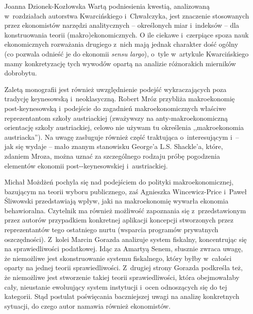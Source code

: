 \begin{recplenv}{Joanna Dzionek-Kozłowska}
Wartą podniesienia kwestią, analizowaną w~rozdziałach autorstwa Kwarcińskiego i~Chwałczyka, jest znaczenie stosowanych
przez ekonomistów narzędzi analitycznych -- określonych miar i~indeksów -- dla konstruowania teorii (makro)ekonomicznych.
O ile ciekawe i~czerpiące spoza nauk ekonomicznych rozważania drugiego z~nich mają jednak charakter dość ogólny (co
pozwala odnieść je do ekonomii \textit{sensu largo}), o~tyle w~artykule Kwarcińskiego mamy konkretyzację tych wywodów
opartą na analizie różnorakich mierników dobrobytu. 

Zaletą monografii jest również uwzględnienie podejść wykraczających poza tradycję keynesowską i~neoklasyczną. Robert
Mróz przybliża makroekonomię post-keynesowską i~podejście do zagadnień makroekonomicznych właściwe reprezentantom
szkoły austriackiej (zważywszy na anty-makroekonomiczną orientację szkoły austriackiej, celowo nie używam tu określenia
,,makroekonomia austriacka''). Na uwagę zasługuje również część traktująca o~interesującym i~-- jak się wydaje -- mało
znanym stanowisku George'a L.S. Shackle'a, które, zdaniem Mroza, można uznać za szczególnego rodzaju próbę pogodzenia
elementów ekonomii post-\mbox{-keynesowskiej} i~austriackiej.

Michał Możdżeń pochyla się nad podejściem do polityki makroekonomicznej, bazującym na teorii wyboru publicznego, zaś
Agnieszka Wincewicz-Price i~Paweł Śliwowski przedstawiają wpływ, jaki na makroekonomię wywarła ekonomia behawioralna.
Czytelnik ma również możliwość zapoznania się z~przedstawionym przez autorów przypadkiem konkretnej aplikacji koncepcji
stworzonych przez reprezentantów tego ostatniego nurtu (wsparcia programów prywatnych oszczędności). Z~kolei Marcin
Gorazda analizuje system fiskalny, koncentrując się na sprawiedliwości podatkowej. Idąc za Amartyą Senem, słusznie
zwraca uwagę, że niemożliwe jest skonstruowanie systemu fiskalnego, który byłby w~całości oparty na jednej teorii
sprawiedliwości. Z~drugiej strony Gorazda podkreśla też, że niemożliwe jest stworzenie takiej teorii sprawiedliwości,
która obejmowałaby cały, nieustanie ewoluujący system instytucji i~ocen odnoszących się do tej kategorii. Stąd postulat
poświęcania baczniejszej uwagi na analizę konkretnych sytuacji, do czego autor namawia również ekonomistów.


\end{recplenv}
